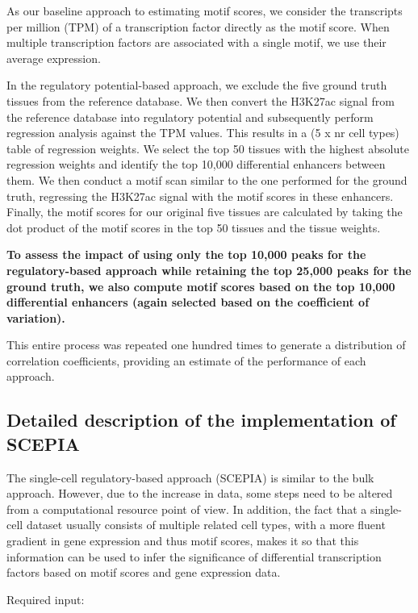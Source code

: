 As our baseline approach to estimating motif scores, we consider the transcripts per million (TPM) of a transcription factor directly as the motif score. When multiple transcription factors are associated with a single motif, we use their average expression.

In the regulatory potential-based approach, we exclude the five ground truth tissues from the reference database. We then convert the H3K27ac signal from the reference database into regulatory potential and subsequently perform regression analysis against the TPM values. This results in a (5 x nr cell types) table of regression weights. We select the top 50 tissues with the highest absolute regression weights and identify the top 10,000 differential enhancers between them. We then conduct a motif scan similar to the one performed for the ground truth, regressing the H3K27ac signal with the motif scores in these enhancers. Finally, the motif scores for our original five tissues are calculated by taking the dot product of the motif scores in the top 50 tissues and the tissue weights.

\textbf{To assess the impact of using only the top 10,000 peaks for the regulatory-based approach while retaining the top 25,000 peaks for the ground truth, we also compute motif scores based on the top 10,000 differential enhancers (again selected based on the coefficient of variation).}

This entire process was repeated one hundred times to generate a distribution of correlation coefficients, providing an estimate of the performance of each approach.

\subsection{Detailed description of the implementation of SCEPIA}

The single-cell regulatory-based approach (SCEPIA) is similar to the bulk approach. However, due to the  increase in data, some steps need to be altered from a computational resource point of view. In addition, the fact that a single-cell dataset usually consists of multiple related cell types, with a more fluent gradient in gene expression and thus motif scores, makes it so that this information can be used to infer the significance of differential transcription factors based on motif scores and gene expression data.

\noindent
Required input:

